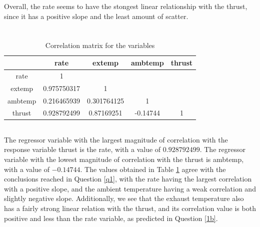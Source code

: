 \documentclass[letterpaper]{article}
\begin{document}
Overall, the rate seems to have the stongest linear relationship with the thrust,
since it has a positive slope and the least amount of scatter.

\section{}

\subsection{}

\begin{table}[H]
 \centering
 \begin{tabular}{c|c|c|c|c|}
          & rate        & extemp      & ambtemp  & thrust \\ \hline
  rate    & 1           &             &          &        \\ \hline
  extemp  & 0.975750317 & 1           &          &        \\ \hline
  ambtemp & 0.216465939 & 0.301764125 & 1        &        \\ \hline
  thrust  & 0.928792499 & 0.87169251  & -0.14744 & 1      \\ \hline
 \end{tabular}
 \caption{Correlation matrix for the variables}
 \label{correlationmatrix}
\end{table}

\subsection{}

The regressor variable with the largest magnitude of correlation with the response
variable thrust is the rate, with a value of $0.928792499$.
The regressor variable with the lowest magnitude of correlation with the thrust
is ambtemp, with a value of $-0.14744$.
The values obtained in Table \ref{correlationmatrix} agree
with the conclusions reached in Question \ref{q1}, with
the rate having the largest correlation with a positive slope, and the
ambient temperature having a weak correlation and slightly negative slope.
Additionally, we see that the exhaust temperature also has a fairly strong
linear relation with the thrust, and its correlation value is both positive and less than
the rate variable, as predicted in Question \ref{1b}.
\end{document}
